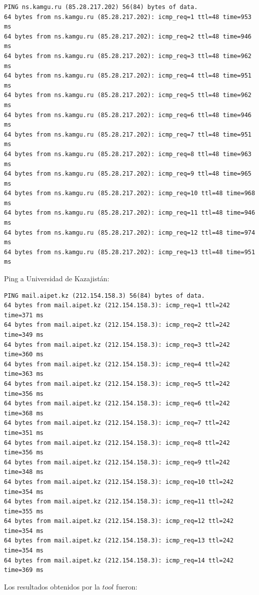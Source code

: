 \begin{verbatim}
PING ns.kamgu.ru (85.28.217.202) 56(84) bytes of data.
64 bytes from ns.kamgu.ru (85.28.217.202): icmp_req=1 ttl=48 time=953 ms
64 bytes from ns.kamgu.ru (85.28.217.202): icmp_req=2 ttl=48 time=946 ms
64 bytes from ns.kamgu.ru (85.28.217.202): icmp_req=3 ttl=48 time=962 ms
64 bytes from ns.kamgu.ru (85.28.217.202): icmp_req=4 ttl=48 time=951 ms
64 bytes from ns.kamgu.ru (85.28.217.202): icmp_req=5 ttl=48 time=962 ms
64 bytes from ns.kamgu.ru (85.28.217.202): icmp_req=6 ttl=48 time=946 ms
64 bytes from ns.kamgu.ru (85.28.217.202): icmp_req=7 ttl=48 time=951 ms
64 bytes from ns.kamgu.ru (85.28.217.202): icmp_req=8 ttl=48 time=963 ms
64 bytes from ns.kamgu.ru (85.28.217.202): icmp_req=9 ttl=48 time=965 ms
64 bytes from ns.kamgu.ru (85.28.217.202): icmp_req=10 ttl=48 time=968 ms
64 bytes from ns.kamgu.ru (85.28.217.202): icmp_req=11 ttl=48 time=946 ms
64 bytes from ns.kamgu.ru (85.28.217.202): icmp_req=12 ttl=48 time=974 ms
64 bytes from ns.kamgu.ru (85.28.217.202): icmp_req=13 ttl=48 time=951 ms
\end{verbatim}

Ping a Universidad de Kazajistán:

\begin{verbatim}
PING mail.aipet.kz (212.154.158.3) 56(84) bytes of data.
64 bytes from mail.aipet.kz (212.154.158.3): icmp_req=1 ttl=242 time=371 ms
64 bytes from mail.aipet.kz (212.154.158.3): icmp_req=2 ttl=242 time=349 ms
64 bytes from mail.aipet.kz (212.154.158.3): icmp_req=3 ttl=242 time=360 ms
64 bytes from mail.aipet.kz (212.154.158.3): icmp_req=4 ttl=242 time=363 ms
64 bytes from mail.aipet.kz (212.154.158.3): icmp_req=5 ttl=242 time=356 ms
64 bytes from mail.aipet.kz (212.154.158.3): icmp_req=6 ttl=242 time=368 ms
64 bytes from mail.aipet.kz (212.154.158.3): icmp_req=7 ttl=242 time=351 ms
64 bytes from mail.aipet.kz (212.154.158.3): icmp_req=8 ttl=242 time=356 ms
64 bytes from mail.aipet.kz (212.154.158.3): icmp_req=9 ttl=242 time=348 ms
64 bytes from mail.aipet.kz (212.154.158.3): icmp_req=10 ttl=242 time=354 ms
64 bytes from mail.aipet.kz (212.154.158.3): icmp_req=11 ttl=242 time=355 ms
64 bytes from mail.aipet.kz (212.154.158.3): icmp_req=12 ttl=242 time=354 ms
64 bytes from mail.aipet.kz (212.154.158.3): icmp_req=13 ttl=242 time=354 ms
64 bytes from mail.aipet.kz (212.154.158.3): icmp_req=14 ttl=242 time=369 ms
\end{verbatim}

Los resultados obtenidos por la $tool$ fueron:

